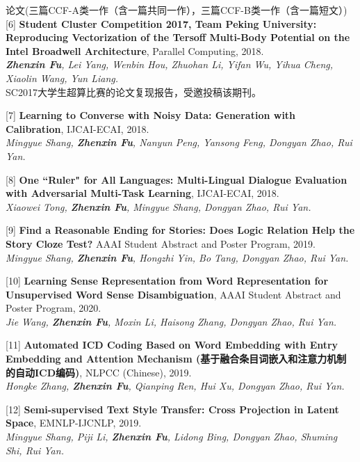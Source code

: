 \documentclass{resume} %
\begin{document}
\begin{rSection}{论文(三篇CCF-A类一作（含一篇共同一作），三篇CCF-B类一作（含一篇短文）)}
    [6] \textbf{Student Cluster Competition 2017, Team Peking University: Reproducing Vectorization of the Tersoff Multi-Body Potential on the Intel Broadwell Architecture}, Parallel Computing, 2018. \\
    {\it \textbf{Zhenxin Fu}, Lei Yang, Wenbin Hou, Zhuohan Li, Yifan Wu, Yihua Cheng, Xiaolin Wang, Yun Liang.} \\
    SC2017大学生超算比赛的论文复现报告，受邀投稿该期刊。
    \vspace{-0.1cm}

    [7] \textbf{Learning to Converse with Noisy Data: Generation with Calibration}, IJCAI-ECAI, 2018. \\
    {\it Mingyue Shang, \textbf{Zhenxin Fu}, Nanyun Peng, Yansong Feng, Dongyan Zhao, Rui Yan.} 
    \vspace{-0.1cm}

    [8] \textbf{One ``Ruler" for All Languages: Multi-Lingual Dialogue Evaluation with Adversarial Multi-Task Learning}, IJCAI-ECAI, 2018. \\
    {\it Xiaowei Tong, \textbf{Zhenxin Fu}, Mingyue Shang, Dongyan Zhao, Rui Yan.}
    \vspace{-0.1cm}

    [9] \textbf{Find a Reasonable Ending for Stories: Does Logic Relation Help the Story Cloze Test?} AAAI Student Abstract and Poster Program, 2019. \\
    {\it Mingyue Shang, \textbf{Zhenxin Fu}, Hongzhi Yin, Bo Tang, Dongyan Zhao, Rui Yan.}
    \vspace{-0.1cm}

    [10] \textbf{Learning Sense Representation from Word Representation for Unsupervised Word Sense Disambiguation}, AAAI Student Abstract and Poster Program, 2020. \\
    {\it Jie Wang, \textbf{Zhenxin Fu}, Moxin Li, Haisong Zhang, Dongyan Zhao, Rui Yan.}
    \vspace{-0.1cm}

    [11] \textbf{Automated ICD Coding Based on Word Embedding with Entry Embedding and Attention Mechanism (基于融合条目词嵌入和注意力机制的自动ICD编码)}, NLPCC (Chinese), 2019. \\
    {\it Hongke Zhang, \textbf{Zhenxin Fu}, Qianping Ren, Hui Xu, Dongyan Zhao, Rui Yan.}
    \vspace{-0.1cm}

    [12] \textbf{Semi-supervised Text Style Transfer: Cross Projection in Latent Space}, EMNLP-IJCNLP, 2019. \\
    {\it Mingyue Shang, Piji Li, \textbf{Zhenxin Fu}, Lidong Bing, Dongyan Zhao, Shuming Shi, Rui Yan.}
    \vspace{-0.1cm}


\end{rSection}
\end{document}

